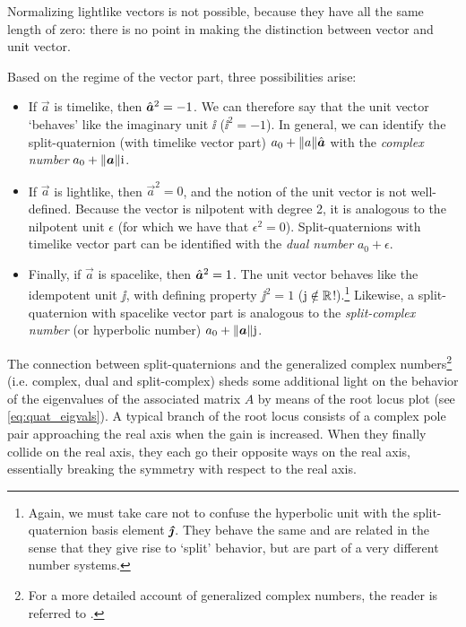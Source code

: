 Normalizing lightlike vectors is not possible, because they have all the same length of zero: there is no point in making the distinction between vector and unit vector. 

Based on the regime of the vector part, three possibilities arise: \cite{Motter1998,Harkin2004}
\begin{itemize}
    \item If \(\vec{a}\) is timelike, then \(\uvec{a}^2 = -1\). We can therefore say that the unit vector `behaves' like the imaginary unit \(\ii\) (\(\ii^2 = -1\)). In general, we can identify the split-quaternion (with timelike vector part) \( a_0 + \norm{a}\uvec{a}\) with the \emph{complex number} \(a_0 + \norm{\vec{a}}\ii\). 
    \item If \(\vec{a}\) is lightlike, then \(\vec{a}^2 = 0\), and the notion of the unit vector is not well-defined. Because the vector is nilpotent with degree 2, it is analogous to the nilpotent unit \(\epsilon\) (for which we have that \(\epsilon^2 = 0\)). Split-quaternions with timelike vector part can be identified with the \emph{dual number} \(a_0 + \epsilon\). 
    \item Finally, if \(\vec{a}\) is spacelike, then \(\uvec{a}^2 = 1\). The unit vector behaves like the idempotent unit \(\jj\), with defining property \(\jj^2 = 1\) (\(\mathrm{j} \notin \mathbb{R}\)!).\footnote
        {Again, we must take care not to confuse the hyperbolic unit with the split-quaternion basis element \(\quatj\). They behave the same and are related in the sense that they give rise to `split' behavior, but are part of a very different number systems.}
        Likewise, a split-quaternion with spacelike vector part is analogous to the \emph{split-complex number} (or hyperbolic number) \(a_0 + \norm{\vec{a}}\jj\).
\end{itemize}

The connection between split-quaternions and the generalized complex numbers\footnote
{For a more detailed account of generalized complex numbers, the reader is referred to \citet{Harkin2004}.}
(i.e. complex, dual and split-complex)
sheds some additional light on the behavior of the eigenvalues of the associated matrix \(A\) by means of the root locus plot (see \cref{eq:quat_eigvals}). A typical branch of the  root locus consists of a complex pole pair approaching the real axis when the gain is increased. When they finally collide on the real axis, they each go their opposite ways on the real axis, essentially breaking the symmetry with respect to the real axis. 

